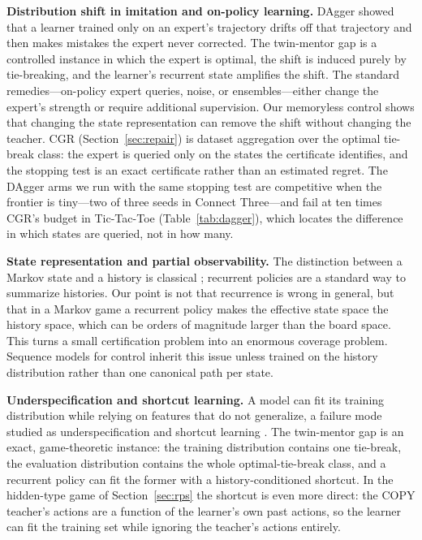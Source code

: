 \documentclass[conference]{IEEEtran}
\begin{document}
\textbf{Distribution shift in imitation and on-policy learning.} DAgger \cite{ross2011} showed that a learner trained only on an expert's trajectory drifts off that trajectory and then makes mistakes the expert never corrected. The twin-mentor gap is a controlled instance in which the expert is optimal, the shift is induced purely by tie-breaking, and the learner's recurrent state amplifies the shift. The standard remedies---on-policy expert queries, noise, or ensembles---either change the expert's strength or require additional supervision. Our memoryless control shows that changing the state representation can remove the shift without changing the teacher. CGR (Section~\ref{sec:repair}) is dataset aggregation over the optimal tie-break class: the expert is queried only on the states the certificate identifies, and the stopping test is an exact certificate rather than an estimated regret. The DAgger arms we run with the same stopping test are competitive when the frontier is tiny---two of three seeds in Connect Three---and fail at ten times CGR's budget in Tic-Tac-Toe (Table~\ref{tab:dagger}), which locates the difference in which states are queried, not in how many.

\textbf{State representation and partial observability.} The distinction between a Markov state and a history is classical \cite{sutton1998,kaelbling1998,puterman1994}; recurrent policies are a standard way to summarize histories. Our point is not that recurrence is wrong in general, but that in a Markov game a recurrent policy makes the effective state space the history space, which can be orders of magnitude larger than the board space. This turns a small certification problem into an enormous coverage problem. Sequence models for control \cite{cho2014,hasani2021} inherit this issue unless trained on the history distribution rather than one canonical path per state.

\textbf{Underspecification and shortcut learning.} A model can fit its training distribution while relying on features that do not generalize, a failure mode studied as underspecification \cite{damour2020} and shortcut learning \cite{geirhos2020}. The twin-mentor gap is an exact, game-theoretic instance: the training distribution contains one tie-break, the evaluation distribution contains the whole optimal-tie-break class, and a recurrent policy can fit the former with a history-conditioned shortcut. In the hidden-type game of Section~\ref{sec:rps} the shortcut is even more direct: the COPY teacher's actions are a function of the learner's own past actions, so the learner can fit the training set while ignoring the teacher's actions entirely.
\end{document}
